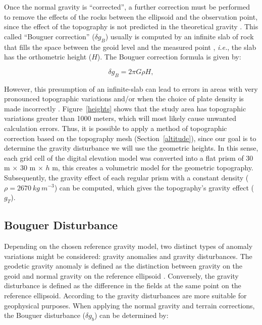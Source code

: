 Once the normal gravity is ``corrected'', a further correction must be performed to remove the effects of the rocks between the ellipsoid and the observation point, since the effect of the topography is not predicted in the theoretical gravity \citep{Encyclopedia_solid_earth_geophysics}. This called ``Bouguer correction'' ($\delta g_{B}$) usually is computed by an infinite slab of rock that fills the space between the geoid level and the measured point \citep{Lowrie1997}, \textit{i.e.}, the slab has the orthometric height ($H$). The Bouguer correction formula is given by:

\begin{equation}
{
\delta g_{B} = 2 \pi G \rho H},
\end{equation}


However, this presumption of an infinite-slab can lead to errors in areas with very pronounced topographic variations and/or when the choice of plate density is made incorrectly \citep{Chapin1996}. Figure~\ref{heights} shows that the study area has topographic variations greater than 1000 meters, which will most likely cause unwanted calculation errors. Thus, it is possible to apply a method of topographic correction \citep[\textit{e.g.,}][]{Nagy2000} based on the topography mesh (Section~\ref{altitude}), since our goal is to determine the gravity disturbance we will use the geometric heights. In this sense, each grid cell of the digital elevation model was converted into a flat prism of 30 m $\times$ 30 m $\times$ $h$ m, this creates a volumetric model for the geometric topography. Subsequently, the gravity effect of each regular prism with a constant density ($\rho = 2670~kg~m^{-3}$) can be computed, which gives the topography's gravity effect ($g_T$).

\subsection{Bouguer Disturbance}
Depending on the chosen reference gravity model, two distinct types of anomaly variations might be considered: gravity anomalies and gravity disturbances. The geodetic gravity anomaly is defined as the distinction between gravity on the geoid and normal gravity on the reference ellipsoid \citep{Blakely1996}. Conversely, the gravity disturbance is defined as the difference in the fields at the same point on the reference ellipsoid. According to \citet{Encyclopedia_solid_earth_geophysics} the gravity disturbances are more suitable for geophysical purposes. When applying the normal gravity and terrain corrections, the Bouguer disturbance ($\delta g_{b}$) can be determined by:

